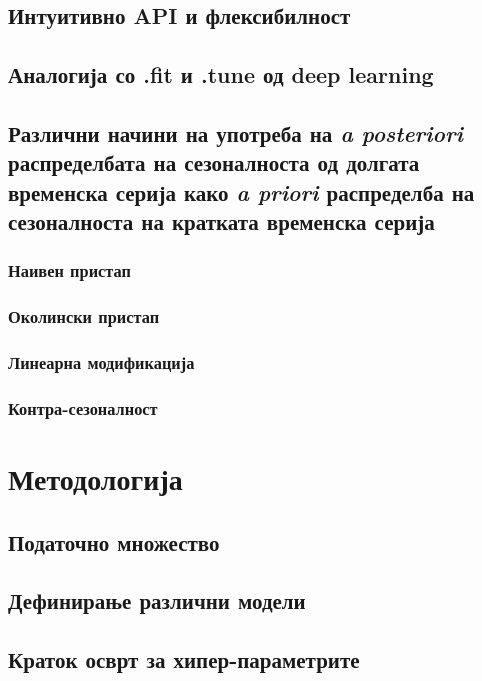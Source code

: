 \documentclass[12pt]{article}
\numberwithin{equation}{section}
\begin{document}
\subsection{Интуитивно API и флексибилност}

\subsection{Аналогија со .fit и .tune од deep learning}

\subsection{Различни начини на употреба на \textit{a posteriori} распределбата на сезоналноста од долгата временска серија како \textit{a priori} распределба на сезоналноста на кратката временска серија}

\subsubsection{Наивен пристап}

\subsubsection{Околински пристап}

\subsubsection{Линеарна модификација}

\subsubsection{Контра-сезоналност}

\newpage

\section{Методологија}

\subsection{Податочно множество}

\subsection{Дефинирање различни модели}

\subsection{Краток осврт за хипер-параметрите}
\end{document}
